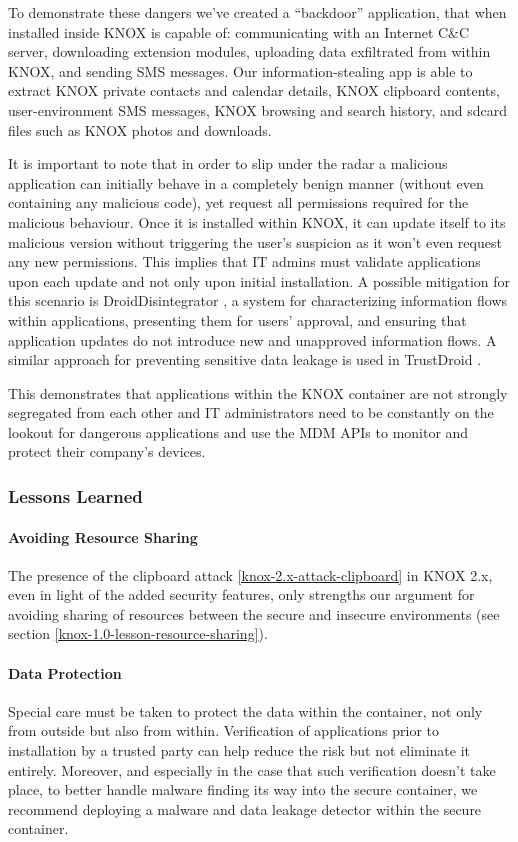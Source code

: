 \documentclass[11pt]{article}
\begin{document}
To demonstrate these dangers we've created a ``backdoor'' application, that when installed inside KNOX is capable of: 
communicating with an Internet C\&C server, downloading extension modules, uploading data exfiltrated from within KNOX,
and sending SMS messages.
Our information-stealing app is able to extract KNOX private contacts and calendar details, KNOX clipboard contents, user-environment SMS messages,
KNOX browsing and search history, and sdcard files such as KNOX photos and downloads.

It is important to note that in order to slip under the radar a malicious application can initially behave in a completely benign manner (without even 
containing any malicious code), yet request all permissions required for the malicious behaviour. Once it is installed within KNOX, it can update itself to 
its malicious version without triggering the user's suspicion as it won't even request any new permissions. This implies that IT admins must
validate applications upon each update and not only upon initial installation. A possible mitigation for this scenario is DroidDisintegrator \cite{DroidDisintegrator}, 
a system for characterizing information flows within applications, presenting them for users' approval, and ensuring that application updates do 
not introduce new and unapproved information flows. A similar approach for preventing sensitive data leakage is used in TrustDroid \cite{TrustDroid}.

This demonstrates that applications within the KNOX container are not strongly segregated from each other and IT administrators need to be constantly on
the lookout for dangerous applications and use the MDM APIs to monitor and protect their company's devices. 

\subsubsection{Lessons Learned}
\paragraph{Avoiding Resource Sharing}
The presence of the clipboard attack \ref{knox-2.x-attack-clipboard} in KNOX 2.x, even in light of the added security features, only strengths our 
argument for avoiding sharing of resources between the secure and insecure environments (see section \ref{knox-1.0-lesson-resource-sharing}).

\paragraph{Data Protection}
Special care must be taken to protect the data within the container, not only from outside but also from within. 
Verification of applications prior to installation by a trusted party can help reduce the risk but not eliminate it entirely. 
Moreover, and especially in the case that such verification doesn't take place, to better handle malware finding its way into the secure container, 
we recommend deploying a malware and data leakage detector within the secure container.
\end{document}
